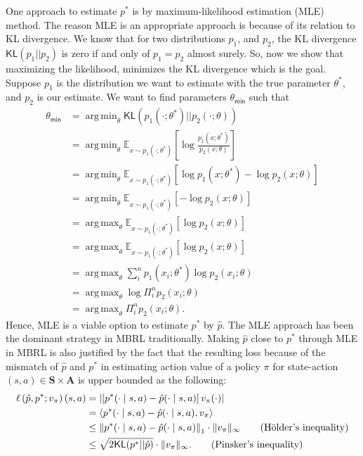 \documentclass[a4paper]{article}
\theoremstyle{definition}
\theoremstyle{remark}
\theoremstyle{plain}
\newcommand{\bA}{\mathbf{A}}
\newcommand{\bS}{\mathbf{S}}
\newcommand{\E}{\mathbb{E}}
\DeclareMathOperator*{\argmax}{arg\,max}
\DeclareMathOperator*{\argmin}{arg\,min}
\begin{document}
One approach to estimate $p^*$ is by maximum-likelihood estimation (MLE) method. The reason MLE is an appropriate approach is because of its relation to KL divergence. We know that for two distributions $p_1$, and $p_2$, the KL divergence $\textsf{KL}(p_1 ||p_2)$ is zero if and only of $p_1 = p_2$ almost surely. So, now we show that maximizing the likelihood, minimizes the KL divergence which is the goal. Suppose $p_1$ is the distribution we want to estimate with the true parameter $\theta^*$, and $p_2$ is our estimate. We want to find parameters $\theta_{\mathsf{min}}$ such that
\begin{align*}
    \theta_{\mathsf{min}} &= \argmin_\theta \mathsf{KL}(p_1(\cdot; \theta^*) || p_2(\cdot; \theta)) \\
    & = \argmin_\theta \E_{x \sim p_1(\cdot; \theta^*)}\left[\log \frac{p_1(x; \theta^*)}{p_2(x; \theta)}\right] \\
    & = \argmin_\theta \E_{x \sim p_1(\cdot; \theta^*)}\left[\log p_1(x; \theta^*) -\log p_2(x; \theta)\right] \\
    & = \argmin_\theta \E_{x \sim p_1(\cdot; \theta^*)}\left[-\log p_2(x; \theta)\right] \tag{$\log p_1(x; \theta^*)$ doesn't affect the argument of minima} \\
    & = \argmax_\theta \E_{x \sim p_1(\cdot; \theta^*)}\left[\log p_2(x; \theta)\right] \\
    & = \argmax_\theta \E_{x \sim p_1(\cdot; \theta^*)}\left[\log p_2(x; \theta)\right] \\
    & = \argmax_\theta \sum_i^n p_1(x_i; \theta^*)\log p_2(x_i; \theta) \tag{If we have a dataset of size $n$} \\
    & = \argmax_\theta \log \Pi_i^n p_2(x_i; \theta)\tag{$p_1(x_i; \theta^*)$ doesn't affect the argument of maxima} \\
    & = \argmax_\theta \Pi_i^n p_2(x_i; \theta) \tag{MLE definition}.
\end{align*}
Hence, MLE is a viable option to estimate $p^*$ by $\hat{p}$. The MLE approach has been the dominant strategy in MBRL traditionally. Making $\hat{p}$ close to $p^*$ through MLE in MBRL is also justified by the fact that the resulting loss because of the mismatch of $\hat{p}$ and $p^*$ in estimating action value of a policy $\pi$ for state-action $(s, a) \in \bS \times \bA$ is upper bounded as the following:
\begin{align*}
    \ell\left(\hat{p}, p^*; v_\pi\right)(s, a) & = \left \lvert \left[p^*(\cdot \mid s, a) - \hat{p}(\cdot \mid s, a) \right]v_\pi(\cdot)\right\rvert \\ 
    & = \left\langle p^*(\cdot \mid s, a) - \hat{p}(\cdot \mid s, a), v_\pi\right\rangle \\
    & \leq \left\lVert p^*(\cdot \mid s, a) - \hat{p}(\cdot \mid s, a)\right\rVert_1 \cdot \lVert v_\pi \rVert_\infty \tag{H{ö}lder's inequality} \\
    & \leq \sqrt{2\mathsf{KL}(p^*||\hat{p})} \cdot \lVert v_\pi \rVert_\infty. \tag{Pinsker's inequality}
\end{align*}
\end{document}
